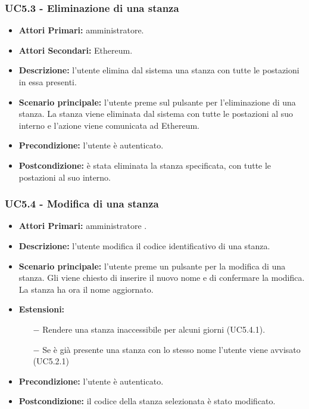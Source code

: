 \subsubsection{ UC5.3 - Eliminazione di una stanza}
\begin{itemize}
	\item\textbf{Attori Primari:}
	amministratore.
	\item\textbf{Attori Secondari:}
	Ethereum.
	\item\textbf{Descrizione:} 
	l'utente elimina dal sistema una stanza con tutte le postazioni in essa presenti.
	\item\textbf{Scenario principale:} 
	l'utente preme sul pulsante per l'eliminazione di una stanza. La stanza viene eliminata dal sistema con tutte le postazioni al suo interno e l'azione viene comunicata ad Ethereum.
	\item\textbf{Precondizione:} 
	l'utente è autenticato.
	\item\textbf{Postcondizione:}
	è stata eliminata la stanza specificata, con tutte le postazioni al suo interno.
\end{itemize}

\subsubsection{ UC5.4 - Modifica di una stanza}
\begin{itemize}
	\item\textbf{Attori Primari:}
	amministratore .
	\item\textbf{Descrizione:}
	l'utente modifica il codice identificativo di una stanza.
	\item\textbf{Scenario principale:} 
	l'utente preme un pulsante per la modifica di una stanza. Gli viene chiesto di inserire il nuovo nome e di confermare la modifica. La stanza ha ora il nome aggiornato.
	\item\textbf{Estensioni:}
	\begin{itemize}
		\item[$-$] Rendere una stanza inaccessibile per alcuni giorni (UC5.4.1).
		\item[$-$] Se è già presente una stanza con lo stesso nome l'utente viene avvisato (UC5.2.1)
	\end{itemize}

	\item\textbf{Precondizione:} 
	l'utente è autenticato.
	\item\textbf{Postcondizione:}
	il codice della stanza selezionata è stato modificato.
\end{itemize}

